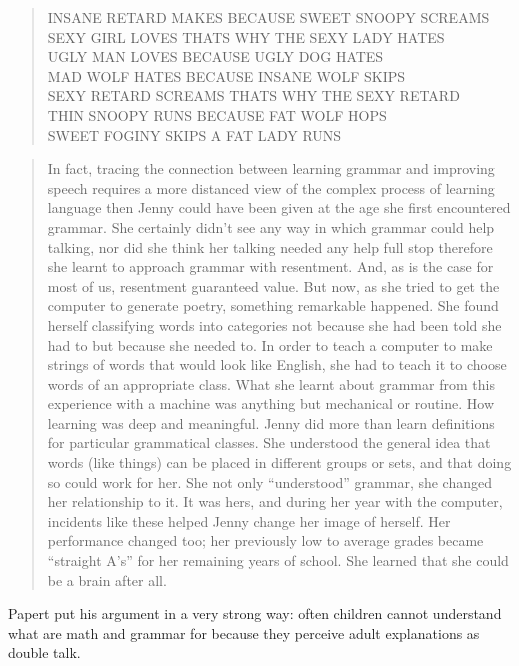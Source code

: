 \begin{quote}
INSANE RETARD MAKES BECAUSE SWEET SNOOPY SCREAMS\\
SEXY GIRL LOVES THATS WHY THE SEXY LADY HATES\\
UGLY MAN LOVES BECAUSE UGLY DOG HATES\\
MAD WOLF HATES BECAUSE INSANE WOLF SKIPS\\
SEXY RETARD SCREAMS THATS WHY THE SEXY RETARD\\
THIN SNOOPY RUNS BECAUSE FAT WOLF HOPS\\
SWEET FOGINY SKIPS A FAT LADY RUNS\\
\end{quote}

\begin{quote}
In fact, tracing the connection between learning grammar and improving speech requires a more distanced view of the complex process of learning language then Jenny could have been given at the age she first encountered grammar. She certainly didn't see any way in which grammar could help talking, nor did she think her talking needed any help full stop  therefore she learnt to approach grammar with resentment. And, as is the case for most of us, resentment guaranteed value. But now, as she tried to get the computer to generate poetry, something remarkable happened.  She found herself classifying words into categories not because she had been told she had to but because she needed to. In order to teach a computer to make strings of words that would look like English, she had to teach it to choose words of an appropriate class. What she learnt about grammar from this experience with a machine was anything but mechanical or routine. How learning was deep and meaningful.  Jenny did more than learn definitions for particular grammatical classes. She understood the general idea that words (like things) can be placed in different groups or sets, and that doing so could work for her. She not only “understood” grammar, she changed her relationship to it. It was hers, and during her year with the computer, incidents like these helped Jenny change her image of herself.  Her performance changed too; her previously low to average grades became “straight A's” for her remaining years of school. She learned that she could be a brain after all.
\end{quote}

Papert put his argument in a very strong way: often children cannot understand what are math and grammar for because they perceive adult explanations as double talk.

